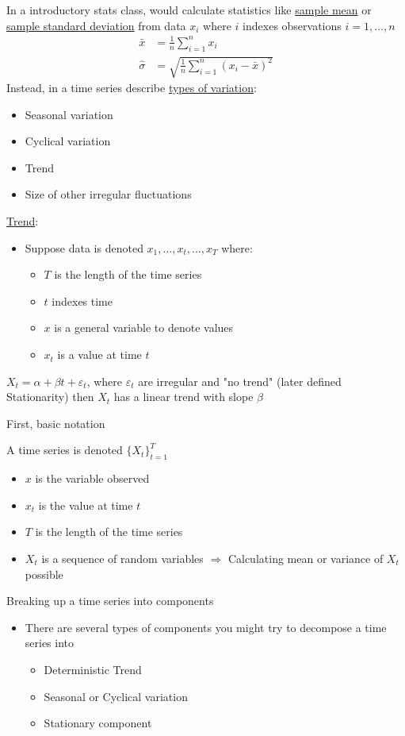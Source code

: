 In a introductory stats class, would calculate statistics like \underline{sample mean} or \underline{sample standard deviation} from data $x_i$ where $i$ indexes observations $i=1,...,n$ 
\begin{align*}
    \bar{x}&=\frac{1}{n}\sum_{i=1}^n x_i \\
    \hat{\sigma}&=\sqrt{\frac{1}{n}\sum_{i=1}^n (x_i - \bar{x})^2}
\end{align*}
Instead, in a time series describe \underline{types of variation}:
\begin{itemize}
    \item Seasonal variation
    \item Cyclical variation
    \item Trend
    \item Size of other irregular fluctuations
\end{itemize}

\underline{Trend}: 
\begin{itemize}
    \item[] Suppose data is denoted $x_1,...,x_t,...,x_T$ where:
    \begin{itemize}[label=\textbullet]
        \item $T$ is the length of the time series
        \item $t$ indexes time
        \item $x$ is a general variable to denote values
        \item $x_t$ is a value at time $t$
    \end{itemize}
\end{itemize}
$X_t = \alpha + \beta t + \varepsilon_t$, where $\varepsilon_t$ are irregular and "no trend" (later defined Stationarity) then $X_t$ has a linear trend with slope $\beta$



First, basic notation

A time series is denoted $\{X_t\}_{t=1}^T$
\begin{itemize}
    \item $x$ is the variable observed
    \item $x_t$ is the value at time $t$
    \item $T$ is the length of the time series
    \item $X_t$ is a sequence of random variables $\Rightarrow$ Calculating mean or variance of $X_t$ possible
\end{itemize}

Breaking up a time series into components
\begin{itemize}
    \item[] There are several types of components you might try to decompose a time series into
    \begin{itemize}
        \item Deterministic Trend
        \item Seasonal or Cyclical variation
        \item Stationary component
    \end{itemize}
\end{itemize}

